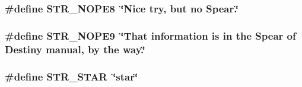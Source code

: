 \label{F__SPEAR_8H_a50f945542e840e45fb5dcff0fc689a1c}
\hypertarget{F__SPEAR_8H_aac118b9dda85e6d7861f36ecba8a4f43}{
\subsubsection[{STR\_\-NOPE8}]{\setlength{\rightskip}{0pt plus 5cm}\#define STR\_\-NOPE8~\char`\"{}Nice try, but no Spear.\char`\"{}}}
\label{F__SPEAR_8H_aac118b9dda85e6d7861f36ecba8a4f43}
\hypertarget{F__SPEAR_8H_ac5929463ce90020d782375e78474de84}{
\subsubsection[{STR\_\-NOPE9}]{\setlength{\rightskip}{0pt plus 5cm}\#define STR\_\-NOPE9~\char`\"{}That information is in the Spear of Destiny manual, by the way.\char`\"{}}}
\label{F__SPEAR_8H_ac5929463ce90020d782375e78474de84}
\hypertarget{F__SPEAR_8H_a531fee0254e344c223abd9667bbef9d8}{
\subsubsection[{STR\_\-STAR}]{\setlength{\rightskip}{0pt plus 5cm}\#define STR\_\-STAR~\char`\"{}star\char`\"{}}}
\label{F__SPEAR_8H_a531fee0254e344c223abd9667bbef9d8}
